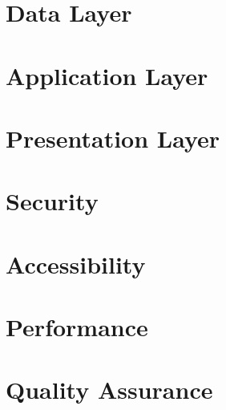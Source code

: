\documentclass[12pt]{report}
\begin{document}
\chapter{Data Layer} \label{ch:data-layer}


\chapter{Application Layer} \label{ch:application-layer}


\chapter{Presentation Layer} \label{ch:presentation-layer}


\chapter{Security} \label{ch:security}


\chapter{Accessibility} \label{ch:accessibility}


\chapter{Performance} \label{ch:performance}


\chapter{Quality Assurance} \label{ch:quality-assurance}
\end{document}
